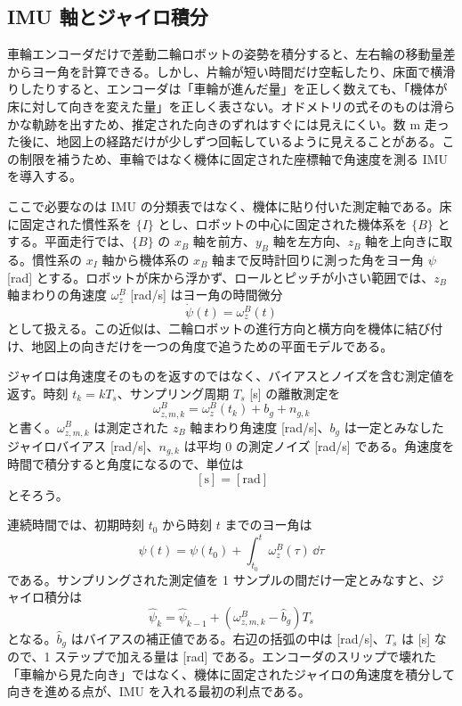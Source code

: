 \subsection{IMU 軸とジャイロ積分}

車輪エンコーダだけで差動二輪ロボットの姿勢を積分すると、左右輪の移動量差からヨー角を計算できる。しかし、片輪が短い時間だけ空転したり、床面で横滑りしたりすると、エンコーダは「車輪が進んだ量」を正しく数えても、「機体が床に対して向きを変えた量」を正しく表さない。オドメトリの式そのものは滑らかな軌跡を出すため、推定された向きのずれはすぐには見えにくい。数 m 走った後に、地図上の経路だけが少しずつ回転しているように見えることがある。この制限を補うため、車輪ではなく機体に固定された座標軸で角速度を測る IMU を導入する。

ここで必要なのは IMU の分類表ではなく、機体に貼り付いた測定軸である。床に固定された慣性系を $\{I\}$ とし、ロボットの中心に固定された機体系を $\{B\}$ とする。平面走行では、$\{B\}$ の $x_B$ 軸を前方、$y_B$ 軸を左方向、$z_B$ 軸を上向きに取る。慣性系の $x_I$ 軸から機体系の $x_B$ 軸まで反時計回りに測った角をヨー角 $\psi$ [rad] とする。ロボットが床から浮かず、ロールとピッチが小さい範囲では、$z_B$ 軸まわりの角速度 $\omega_z^B$ [rad/s] はヨー角の時間微分
\begin{equation}
  \dot{\psi}(t)=\omega_z^B(t)
\end{equation}
として扱える。この近似は、二輪ロボットの進行方向と横方向を機体に結び付け、地図上の向きだけを一つの角度で追うための平面モデルである。

ジャイロは角速度そのものを返すのではなく、バイアスとノイズを含む測定値を返す。時刻 $t_k=kT_s$、サンプリング周期 $T_s$ [s] の離散測定を
\begin{equation}
  \omega_{z,m,k}^B
  =
  \omega_z^B(t_k)+b_g+n_{g,k}
\end{equation}
と書く。$\omega_{z,m,k}^B$ は測定された $z_B$ 軸まわり角速度 [rad/s]、$b_g$ は一定とみなしたジャイロバイアス [rad/s]、$n_{g,k}$ は平均 0 の測定ノイズ [rad/s] である。角速度を時間で積分すると角度になるので、単位は
\begin{equation}
  [\mathrm{rad/s}]\,[\mathrm{s}]=[\mathrm{rad}]
\end{equation}
とそろう。

連続時間では、初期時刻 $t_0$ から時刻 $t$ までのヨー角は
\begin{equation}
  \psi(t)
  =
  \psi(t_0)+\int_{t_0}^{t}\omega_z^B(\tau)\,\dd\tau
\end{equation}
である。サンプリングされた測定値を 1 サンプルの間だけ一定とみなすと、ジャイロ積分は
\begin{equation}
  \hat{\psi}_k
  =
  \hat{\psi}_{k-1}
  +
  \left(\omega_{z,m,k}^B-\hat{b}_g\right)T_s
\end{equation}
となる。$\hat{b}_g$ はバイアスの補正値である。右辺の括弧の中は [rad/s]、$T_s$ は [s] なので、1 ステップで加える量は [rad] である。エンコーダのスリップで壊れた「車輪から見た向き」ではなく、機体に固定されたジャイロの角速度を積分して向きを進める点が、IMU を入れる最初の利点である。

